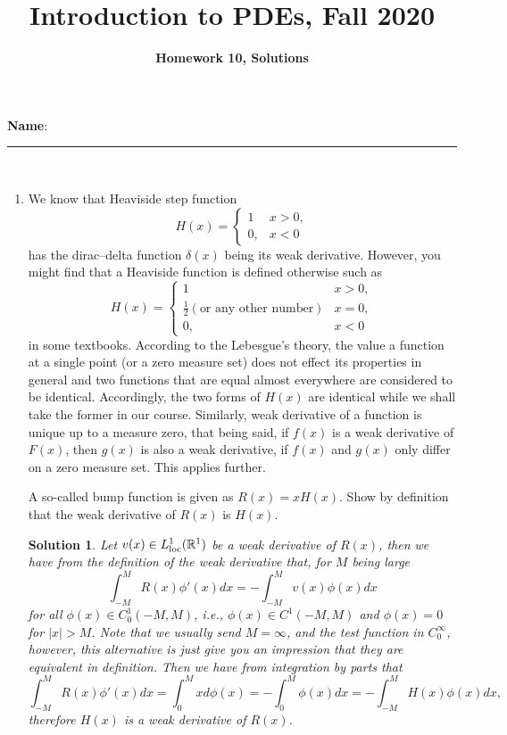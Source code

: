 \documentclass[6pt]{article}
\title{Introduction to PDEs, Fall 2020}
\author{\textbf{Homework 10, Solutions}}
\date{}
\newtheorem{solution}{Solution}
\numberwithin{equation}{section}
\def\mathbb{\Bbb}
\begin{document}
\maketitle

\textbf{Name}:\rule{1 in}{0.001 in} \\

\begin{enumerate}

\item We know that Heaviside step function
\begin{equation}H(x)=
\left\{
\begin{array}{ll}
1& x> 0, \\
0,&x<0
\end{array}
\right.
\end{equation}
has the dirac--delta function $\delta(x)$ being its weak derivative.  However, you might find that a Heaviside function is defined otherwise such as
\begin{equation}H(x)=
\left\{
\begin{array}{ll}
1& x> 0, \\
\frac{1}{2} (\text{or any other number})& x= 0, \\
0,&x<0
\end{array}
\right.
\end{equation}
in some textbooks.  According to the Lebesgue's theory, the value a function at a single point (or a zero
measure set) does not effect its properties in general and two functions that are equal almost everywhere are
considered to be identical.  Accordingly, the two forms of $H(x)$ are identical while we shall take the former in our course.  Similarly, weak derivative of a function is unique up to a measure zero, that being said, if $f(x)$ is a weak derivative of $F(x)$, then $g(x)$ is also a weak derivative, if $f(x)$ and $g(x)$ only differ on a zero measure set.  This applies further.

A so-called bump function is given as $R(x)=xH(x)$.  Show by definition that the weak derivative of $R(x)$ is $H(x)$.
\begin{solution}
Let $v(x)\in L^1_{\text{loc}}(\mathbb{R}^1)$ be a weak derivative of $R(x)$, then we have from the definition of the weak derivative that, for $M$ being large
\[\int_{-M}^M R(x)\phi'(x)dx=-\int_{-M}^M v(x)\phi(x)dx\]
for all $\phi(x)\in C^1_0(-M,M)$, i.e., $\phi(x)\in C^1(-M,M)$ and $\phi(x)=0$ for $\vert x\vert>M$.  Note that we usually send $M=\infty$, and the test function in $C^\infty_0$, however, this alternative is just give you an impression that they are equivalent in definition.  Then we have from integration by parts that
\[\int_{-M}^M R(x)\phi'(x)dx=\int_0^M x d\phi(x)=-\int_0^M \phi(x) dx=-\int_{-M}^M H(x)\phi(x)dx,\]
therefore $H(x)$ is a weak derivative of $R(x)$.


\end{solution}
\end{enumerate}
\end{document}
